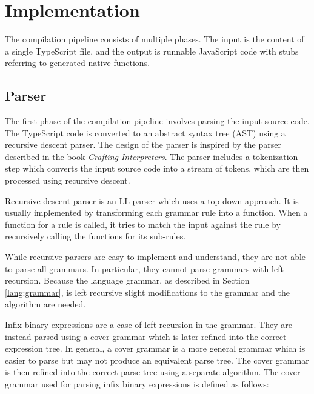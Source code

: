 \chapter{Implementation}

The compilation pipeline consists of multiple phases. The input is the content of a single TypeScript file, and the output is runnable JavaScript code with stubs referring to generated native functions.


\section{Parser}

The first phase of the compilation pipeline involves parsing the input source code. The TypeScript code is converted to an abstract syntax tree (AST) using a recursive descent parser. The design of the parser is inspired by the parser described in the book \textit{Crafting Interpreters}\cite{craftinginterpreters}. The parser includes a tokenization step which converts the input source code into a stream of tokens, which are then processed using recursive descent.

Recursive descent parser is an LL parser which uses a top-down approach. It is usually implemented by transforming each grammar rule into a function. When a function for a rule is called, it tries to match the input against the rule by recursively calling the functions for its sub-rules.

While recursive parsers are easy to implement and understand, they are not able to parse all grammars. In particular, they cannot parse grammars with left recursion. Because the language grammar, as described in Section \ref{lang:grammar}, is left recursive slight modifications to the grammar and the algorithm are needed.

Infix binary expressions are a case of left recursion in the grammar. They are instead parsed using a cover grammar which is later refined into the correct expression tree. In general, a cover grammar is a more general grammar which is easier to parse but may not produce an equivalent parse tree. The cover grammar is then refined into the correct parse tree using a separate algorithm. The cover grammar used for parsing infix binary expressions is defined as follows:

\GrammarRule[BinaryExpression]{}{
    \nonterminal[UnaryExpression]{}{} \gramiter{\nonterminal[InfixBinaryOperator]{}{} \nonterminal[UnaryExpression]{}{}}
}

